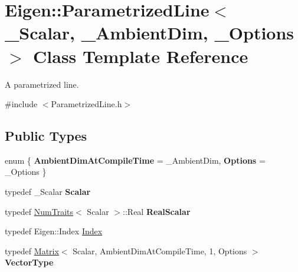 \hypertarget{class_eigen_1_1_parametrized_line}{}\section{Eigen\+::Parametrized\+Line$<$ \+\_\+\+Scalar, \+\_\+\+Ambient\+Dim, \+\_\+\+Options $>$ Class Template Reference}
\label{class_eigen_1_1_parametrized_line}


A parametrized line.  




{\ttfamily \#include $<$Parametrized\+Line.\+h$>$}

\subsection*{Public Types}
\begin{DoxyCompactItemize}
\item 
\mbox{\label{class_eigen_1_1_parametrized_line_ab8f8bb2bb2429e04809177960fe46dfe}} 
enum \{ {\bfseries Ambient\+Dim\+At\+Compile\+Time} = \+\_\+\+Ambient\+Dim, 
{\bfseries Options} = \+\_\+\+Options
 \}
\item 
\mbox{\label{class_eigen_1_1_parametrized_line_a93db650b04cedf2952e2e98a8623ef9e}} 
typedef \+\_\+\+Scalar {\bfseries Scalar}
\item 
\mbox{\label{class_eigen_1_1_parametrized_line_abc5e4b05e33efb054996160850e5fee4}} 
typedef \mbox{\hyperlink{struct_eigen_1_1_num_traits}{Num\+Traits}}$<$ Scalar $>$\+::Real {\bfseries Real\+Scalar}
\item 
typedef Eigen\+::\+Index \mbox{\hyperlink{class_eigen_1_1_parametrized_line_a3c9f84dd8608940282b16652a296c764}{Index}}
\item 
\mbox{\label{class_eigen_1_1_parametrized_line_ab82eb66b19e96584b9cb5e463a076fd6}} 
typedef \mbox{\hyperlink{class_eigen_1_1_matrix}{Matrix}}$<$ Scalar, Ambient\+Dim\+At\+Compile\+Time, 1, Options $>$ {\bfseries Vector\+Type}
\end{DoxyCompactItemize}
